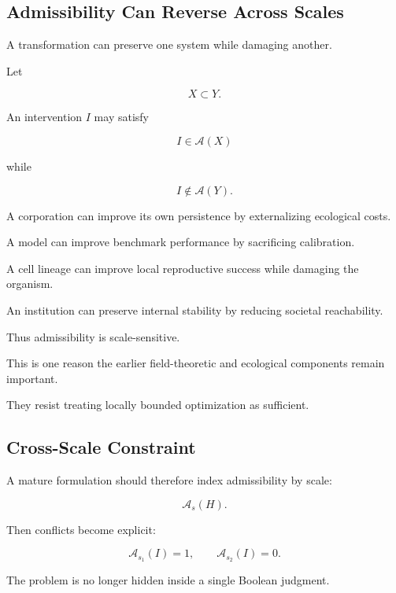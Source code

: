 \documentclass[11pt]{article}
\theoremstyle{remark}
\newcommand{\Adm}{\mathcal{A}}
\begin{document}
\subsection{Admissibility Can Reverse Across Scales}

A transformation can preserve one system while damaging another.

Let

\begin{equation}
X\subset Y.
\end{equation}

An intervention $I$ may satisfy

\begin{equation}
I\in\Adm(X)
\end{equation}

while

\begin{equation}
I\notin\Adm(Y).
\end{equation}

A corporation can improve its own persistence by externalizing ecological costs.

A model can improve benchmark performance by sacrificing calibration.

A cell lineage can improve local reproductive success while damaging the organism.

An institution can preserve internal stability by reducing societal reachability.

Thus admissibility is scale-sensitive.

This is one reason the earlier field-theoretic and ecological components remain important.

They resist treating locally bounded optimization as sufficient.

\subsection{Cross-Scale Constraint}

A mature formulation should therefore index admissibility by scale:

\begin{equation}
\Adm_s(H).
\end{equation}

Then conflicts become explicit:

\begin{equation}
\Adm_{s_1}(I)=1,
\qquad
\Adm_{s_2}(I)=0.
\end{equation}

The problem is no longer hidden inside a single Boolean judgment.
\end{document}
